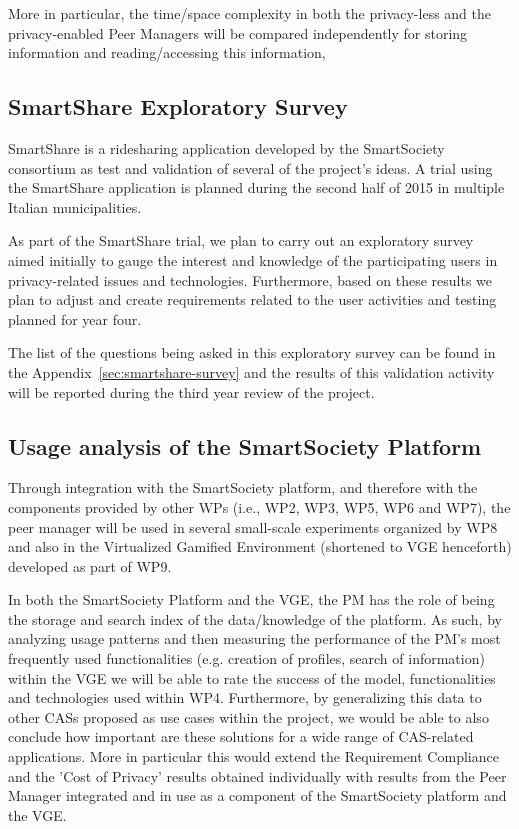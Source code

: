 More in particular, the time/space complexity in both the privacy-less and the privacy-enabled Peer Managers will be compared independently for storing information and reading/accessing this information, 

\subsection{SmartShare Exploratory Survey}
SmartShare is a ridesharing application developed by the SmartSociety consortium as test and validation of several of the project's ideas.  A trial using the SmartShare application is planned during the second half of 2015 in multiple Italian municipalities.  

As part of the SmartShare trial, we plan to carry out an exploratory survey aimed initially to gauge the interest and knowledge of the participating users in privacy-related issues and technologies. Furthermore, based on these results we plan to adjust and create requirements related to the user activities and testing planned for year four.
 
The list of the questions being asked in this exploratory survey can be found in the Appendix~\ref{sec:smartshare-survey} and the results of this validation activity will be reported during the third year review of the project.

\subsection{Usage analysis of the SmartSociety Platform}
Through integration with the SmartSociety platform, and therefore with the components provided by other WPs (i.e., WP2, WP3, WP5, WP6 and WP7), the peer manager will be used in several small-scale experiments organized by WP8 and also in the Virtualized Gamified Environment (shortened to VGE henceforth) developed as part of WP9.

In both the SmartSociety Platform and the VGE, the PM has the role of being the storage and search index of the data/knowledge of the platform. As such, by analyzing usage patterns and then measuring the performance of the PM's most frequently used functionalities (e.g. creation of profiles, search of information) within the VGE we will be able to rate the success of the model, functionalities and technologies used within WP4. Furthermore, by generalizing this data to other CASs proposed as use cases within the project, we would be able to also conclude how important are these solutions for a wide range of CAS-related applications. More in particular this would extend the Requirement Compliance and the 'Cost of Privacy' results obtained individually with results from the Peer Manager integrated and in use as a component of the SmartSociety platform and the VGE. 

